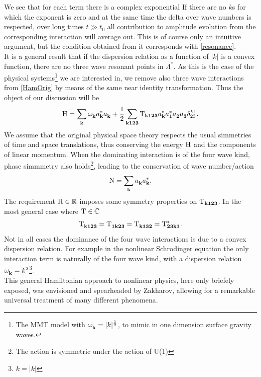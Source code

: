 We see that for each term there is a complex exponential If there are no $k$s for which the exponent is zero and at the same time the delta
over wave numbers is respected, over long times $t \gg t_0$ all contribution to amplitude evolution from the corresponding interaction will average out. This
is of course only an intuitive argument, but the condition obtained from it corresponds with \eqref{resonance}. \\
It is a general result that if the dispersion relation as a function of $|k|$ is a convex function, there are no three wave resonant points in $\Lambda^*$. As
this is the case of the physical systems\footnote{The MMT model with $\omega^{}_{\mathbf{k}} = |k|^\frac{1}{2}$, to mimic in one dimension surface gravity waves.} we are interested in,
we remove also three wave interactions from \eqref{HamOrig} by means of the same near identity transformation. 
Thus the object of our discussion will be 
\begin{equation}
    \mathrm{H} = \sum_\mathbf{k} \omega^{}_{\mathbf{k}} a_\mathbf{k}^{*} a_\mathbf{k}^{} + \frac{1}{2} \sum_{\mathbf{k123}} \mathrm{T}_{\mathbf{k123}} a_\mathbf{k}^{*} a_\mathbf{1}^{*} a_\mathbf{2}^{} a_\mathbf{3}^{} \delta_{23}^{k1}.
    \label{ham4}
\end{equation}
We assume that the original physical space theory respects the usual simmetries of time and space translations, thus conserving the energy $\mathrm{H}$ and 
the components of linear
momentum. When the dominating interaction is of the four wave kind, phase simmmetry also holds\footnote{The action is 
symmetric under the action of U(1)}, leading to the conservation of wave number/action
\begin{equation}
    \mathrm{N} = \sum_\mathbf{k} a_\mathbf{k}^{}a_\mathbf{k}^{*}.
\end{equation} 
The requirement $\mathrm{H}  \in \mathbb{R}$ imposes some symmetry properties on $\mathrm{T}_{\mathbf{k123}}$. In the most general case where $\mathrm{T} \in \mathbb{C}$
\begin{equation}
    \mathrm{T}^{}_\mathbf{k123} = \mathrm{T}^{}_\mathbf{1k23} = \mathrm{T}^{}_\mathbf{k132} = \mathrm{T}^*_\mathbf{23k1}.
\end{equation}
Not in all cases the dominance of the four wave interactions is due to a convex dispersion relation. For example in the nonlinear Schrodinger equation
the only interaction term is naturally of the four wave kind, with a dispersion relation $\omega^{}_{\mathbf{k}} = k^2$\footnote{$k=|k|$}.\\ 
This general Hamiltonian approach to nonlinear physics, here only briefely exposed, was envisioned and spearheaded by Zakharov, allowing for a remarkable universal 
treatment of many different phenomena. \\ 

